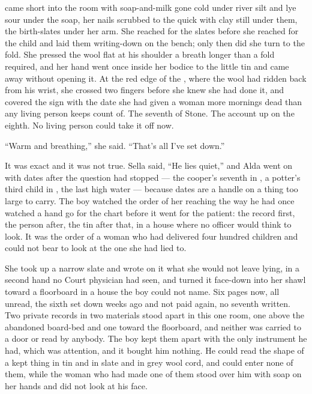  came short into the room with soap-and-milk gone cold under river silt and lye sour under the soap, her nails scrubbed to the quick with clay still under them, the birth-slates under her arm. She reached for the slates before she reached for the child and laid them writing-down on the bench; only then did she turn to the fold. She pressed the wool flat at his shoulder a breath longer than a fold required, and her hand went once inside her bodice to the little tin and came away without opening it. At the red edge of the , where the wool had ridden back from his wrist, she crossed two fingers before she knew she had done it, and covered the sign with the date she had given a woman more mornings dead than any living person keeps count of. The seventh of Stone. The account up on the eighth. No living person could take it off now.

“Warm and breathing,” she said. “That's all I've set down.”

It was exact and it was not true. Sella said, “He lies quiet,” and Alda went on with dates after the question had stopped --- the cooper's seventh in , a potter's third child in , the last high water --- because dates are a handle on a thing too large to carry. The boy watched the order of her reaching the way he had once watched a hand go for the chart before it went for the patient: the record first, the person after, the tin after that, in a house where no officer would think to look. It was the order of a woman who had delivered four hundred children and could not bear to look at the one she had lied to.

She took up a narrow slate and wrote on it what she would not leave lying, in a second hand no Court physician had seen, and turned it face-down into her shawl toward a floorboard in a house the boy could not name. Six pages now, all unread, the sixth set down weeks ago and not paid again, no seventh written. Two private records in two materials stood apart in this one room, one above the abandoned board-bed and one toward the floorboard, and neither was carried to a door or read by anybody. The boy kept them apart with the only instrument he had, which was attention, and it bought him nothing. He could read the shape of a kept thing in tin and in slate and in grey wool cord, and could enter none of them, while the woman who had made one of them stood over him with soap on her hands and did not look at his face.

\scenebreak

